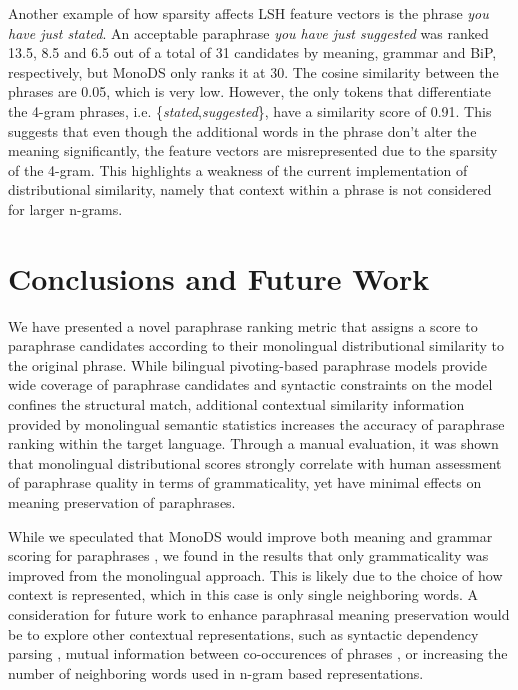 \documentclass[11pt]{article}
\newcommand{\mnote}[1]{\marginpar{\raggedleft\footnotesize\itshape#1}}
\begin{document}
{{%
Another example of how sparsity affects LSH feature vectors is the phrase \emph{you have just stated}. An acceptable paraphrase \emph{you have just suggested} was ranked 13.5, 8.5 and 6.5 out of a total of 31 candidates by meaning, grammar and BiP, respectively, but MonoDS only ranks it at 30. The cosine similarity between the phrases are 0.05, which is very low. However, the only tokens that differentiate the 4-gram phrases, i.e. \{\emph{stated},\emph{suggested}\}, have a similarity score of 0.91. This suggests that even though the additional words in the phrase don't alter the meaning significantly, the feature vectors are misrepresented due to the sparsity of the 4-gram. This highlights a weakness of the current implementation of distributional similarity, namely that context within a phrase is not considered for larger n-grams.

\vspace{-.2cm}
\section{Conclusions and Future Work}
\vspace{-.2cm}
We have presented a novel paraphrase ranking metric that assigns a score to paraphrase candidates according to their monolingual distributional similarity to the original phrase. While bilingual pivoting-based paraphrase models provide wide coverage of paraphrase candidates and syntactic constraints on the model confines the structural match, additional contextual similarity information provided by monolingual semantic statistics increases the accuracy of paraphrase ranking within the target language. %
Through a manual evaluation, it was shown that monolingual distributional scores strongly correlate with human assessment of paraphrase quality in terms of grammaticality, yet have minimal effects on meaning preservation of paraphrases.

While we speculated that MonoDS would improve both meaning and grammar scoring
for paraphrases%
, we found in the results that only grammaticality was
improved from the monolingual approach. This is likely due to the choice of how
context is represented, which in this case is only single neighboring words. A
consideration for future work to enhance paraphrasal meaning preservation would
be to explore other contextual representations, such as syntactic dependency
parsing \cite{LinACL97}, mutual information between co-occurences of phrases
, or increasing the number of neighboring words used in
n-gram based representations.

}}
\end{document}
